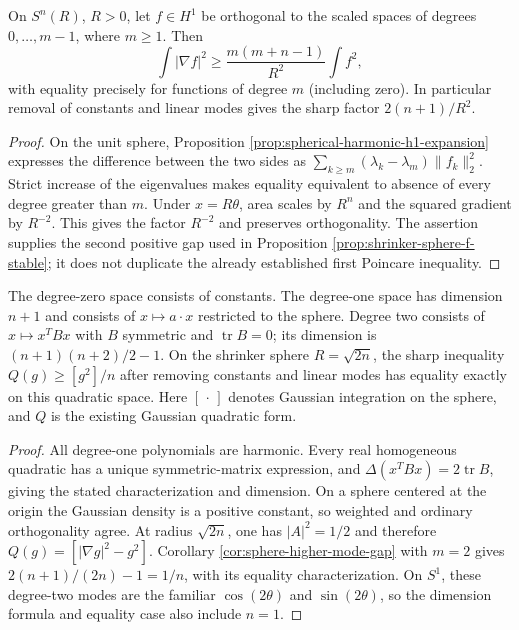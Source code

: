 \begin{corollary}\label{cor:sphere-higher-mode-gap}
On $S^n(R)$, $R>0$, let $f\in H^1$ be orthogonal to the scaled spaces of degrees $0,\ldots,m-1$, where $m\geq1$. Then
\[
 \int|\nabla f|^2\geq\frac{m(m+n-1)}{R^2}\int f^2,
\]
with equality precisely for functions of degree $m$ (including zero). In particular removal of constants and linear modes gives the sharp factor $2(n+1)/R^2$.
\end{corollary}
\begin{proof}
On the unit sphere, Proposition \ref{prop:spherical-harmonic-h1-expansion} expresses the difference between the two sides as $\sum_{k\geq m}(\lambda_k-\lambda_m)\|f_k\|_2^2$. Strict increase of the eigenvalues makes equality equivalent to absence of every degree greater than $m$. Under $x=R\theta$, area scales by $R^n$ and the squared gradient by $R^{-2}$. This gives the factor $R^{-2}$ and preserves orthogonality. The assertion supplies the second positive gap used in Proposition \ref{prop:shrinker-sphere-f-stable}; it does not duplicate the already established first Poincare inequality.
\end{proof}

\begin{example}\label{ex:sphere-low-harmonic-modes}
The degree-zero space consists of constants. The degree-one space has dimension $n+1$ and consists of $x\mapsto a\cdot x$ restricted to the sphere. Degree two consists of $x\mapsto x^TBx$ with $B$ symmetric and $\operatorname{tr}B=0$; its dimension is $(n+1)(n+2)/2-1$. On the shrinker sphere $R=\sqrt{2n}$, the sharp inequality $Q(g)\geq [g^2]/n$ after removing constants and linear modes has equality exactly on this quadratic space. Here $[\,\cdot\,]$ denotes Gaussian integration on the sphere, and $Q$ is the existing Gaussian quadratic form.
\end{example}
\begin{proof}
All degree-one polynomials are harmonic. Every real homogeneous quadratic has a unique symmetric-matrix expression, and $\Delta(x^TBx)=2\operatorname{tr}B$, giving the stated characterization and dimension. On a sphere centered at the origin the Gaussian density is a positive constant, so weighted and ordinary orthogonality agree. At radius $\sqrt{2n}$, one has $|A|^2=1/2$ and therefore $Q(g)=[|\nabla g|^2-g^2]$. Corollary \ref{cor:sphere-higher-mode-gap} with $m=2$ gives $2(n+1)/(2n)-1=1/n$, with its equality characterization. On $S^1$, these degree-two modes are the familiar $\cos(2\theta)$ and $\sin(2\theta)$, so the dimension formula and equality case also include $n=1$.
\end{proof}


